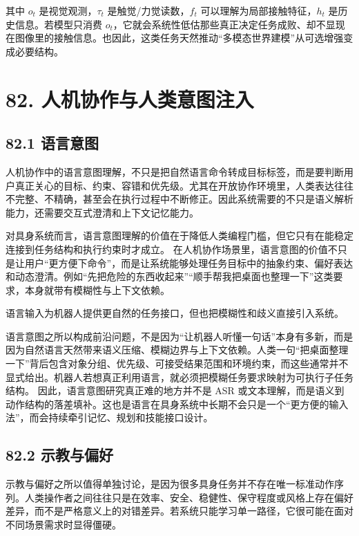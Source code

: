 其中 \(o_t\) 是视觉观测，\(\tau_t\) 是触觉/力觉读数，\(f_t\) 可以理解为局部接触特征，\(h_t\) 是历史信息。若模型只消费 \(o_t\)，它就会系统性低估那些真正决定任务成败、却不显现在图像里的接触信息。也因此，这类任务天然推动“多模态世界建模”从可选增强变成必要结构。

\section*{82. 人机协作与人类意图注入}

\subsection*{82.1 语言意图}


人机协作中的语言意图理解，不只是把自然语言命令转成目标标签，而是要判断用户真正关心的目标、约束、容错和优先级。尤其在开放协作环境里，人类表达往往不完整、不精确，甚至会在执行过程中不断修正。因此系统需要的不只是语义解析能力，还需要交互式澄清和上下文记忆能力。

对具身系统而言，语言意图理解的价值在于降低人类编程门槛，但它只有在能稳定连接到任务结构和执行约束时才成立。 在人机协作场景里，语言意图的价值不只是让用户“更方便下命令”，而是让系统能够处理任务目标中的抽象约束、偏好表达和动态澄清。例如“先把危险的东西收起来”“顺手帮我把桌面也整理一下”这类要求，本身就带有模糊性与上下文依赖。

语言输入为机器人提供更自然的任务接口，但也把模糊性和歧义直接引入系统。

语言意图之所以构成前沿问题，不是因为“让机器人听懂一句话”本身有多新，而是因为自然语言天然带来语义压缩、模糊边界与上下文依赖。人类一句“把桌面整理一下”背后包含对象分组、优先级、可接受结果范围和环境约束，而这些通常并不显式给出。机器人若想真正利用语言，就必须把模糊任务要求映射为可执行子任务结构。 因此，语言意图研究真正难的地方并不是 ASR 或文本理解，而是语义到动作结构的落差填补。这也是语言在具身系统中长期不会只是一个“更方便的输入法”，而会持续牵引记忆、规划和技能接口设计。

\subsection*{82.2 示教与偏好}


示教与偏好之所以值得单独讨论，是因为很多具身任务并不存在唯一标准动作序列。人类操作者之间往往只是在效率、安全、稳健性、保守程度或风格上存在偏好差异，而不是严格意义上的对错差异。若系统只能学习单一路径，它很可能在面对不同场景需求时显得僵硬。

